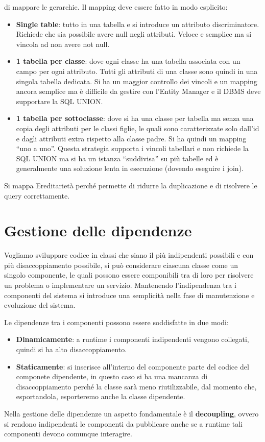 di mappare le gerarchie. Il mapping deve essere fatto in modo esplicito:
\begin{itemize}
      \item \textbf{Single table}: tutto in una tabella e si introduce un attributo
            discriminatore. Richiede che sia possibile avere null negli attributi.
            Veloce e semplice ma si vincola ad non avere not null.
      \item \textbf{1 tabella per classe}: dove ogni classe ha una tabella
            associata con un campo per ogni attributo. Tutti gli attributi di una
            classe sono quindi in una singola tabella dedicata. Si ha un maggior
            controllo dei vincoli e un mapping ancora semplice ma è difficile
            da gestire con l'Entity Manager e il DBMS deve supportare la SQL
            UNION.
      \item \textbf{1 tabella per sottoclasse}: dove si ha una classe per tabella
            ma senza una copia degli attributi per le classi figlie, le quali sono
            caratterizzate solo dall'id e dagli attributi extra rispetto alla
            classe padre. Si ha quindi un mapping “uno a uno”. Questa strategia
            supporta i vincoli tabellari e non richiede la SQL UNION ma si ha un
            istanza “suddivisa” su più tabelle ed è generalmente una soluzione
            lenta in esecuzione (dovendo eseguire i join).
\end{itemize}
Si mappa Ereditarietà perché permette di ridurre la duplicazione e di risolvere
le query correttamente.
\section{Gestione delle dipendenze}
Vogliamo sviluppare codice in classi che siano il più indipendenti possibili e
con più disaccoppiamento possibile, si può considerare ciascuna classe come un
singolo componente, le quali possono essere componibili tra di loro per risolvere
un problema o implementare un servizio. Mantenendo l'indipendenza tra i componenti
del sistema si introduce una semplicità nella fase di manutenzione e evoluzione
del sistema.

Le dipendenze tra i componenti possono essere soddisfatte in due modi:
\begin{itemize}
      \item \textbf{Dinamicamente}: a runtime i componenti indipendenti vengono
            collegati, quindi si ha alto disaccoppiamento.
      \item \textbf{Staticamente}: si inserisce all'interno del componente parte
            del codice del componete dipendente, in questo caso si ha una mancanza
            di disaccoppiamento perché la classe sarà meno riutilizzabile, dal
            momento che, esportandola, esporteremo anche la classe dipendente.
\end{itemize}
Nella gestione delle dipendenze un aspetto fondamentale è il \textbf{decoupling},
ovvero si rendono indipendenti le componenti da pubblicare anche se a runtime tali
componenti devono comunque interagire.

